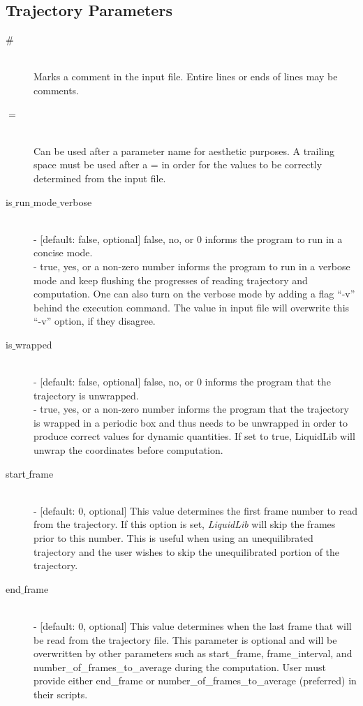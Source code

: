 \documentclass{article}
\begin{document}
\subsection{Trajectory Parameters} \label{sec::general_parameters}
\begin{description}
	\item[$\#$] \hfill \\
	Marks a comment in the input file.  Entire lines or ends of lines may be comments.
	
	\item[$=$] \hfill \\
	Can be used after a parameter name for aesthetic purposes.  A trailing space must be used after a = in order for the values to be correctly determined from the input file.
	
	\item[is$\_$run$\_$mode$\_$verbose] \hfill \\
	- [default: false, optional] false, no, or 0 informs the program to run in a concise mode.\\
	- true, yes, or a non-zero number informs the program to run in a verbose mode and keep flushing the progresses of reading trajectory and computation. One can also turn on the verbose mode by adding a flag ``-v'' behind the execution command. The value in input file will overwrite this ``-v'' option, if they disagree.
	
	\item[is$\_$wrapped] \hfill \\
	- [default: false, optional] false, no, or 0 informs the program that the trajectory is unwrapped.\\
	- true, yes, or a non-zero number informs the program that the trajectory is wrapped in a periodic box and thus needs to be unwrapped in order to produce correct values for dynamic quantities.  If set to true, LiquidLib will unwrap the coordinates before computation.
	
	\item[start$\_$frame] \hfill \\
	- [default: 0, optional] This value determines the first frame number to read from the trajectory.  If this option is set, \textit{LiquidLib} will skip the frames prior to this number.  This is useful when using an unequilibrated trajectory and the user wishes to skip the unequilibrated portion of the trajectory.
	
	\item[end$\_$frame] \hfill \\
	- [default: 0, optional] This value determines when the last frame that will be read from the trajectory file.  This parameter is optional and will be overwritten by other parameters such as start\_frame, frame\_interval, and number\_of\_frames\_to\_average during the computation.  User must provide either end\_frame or number\_of\_frames\_to\_average (preferred) in their scripts.
	

\end{description}
\end{document}
